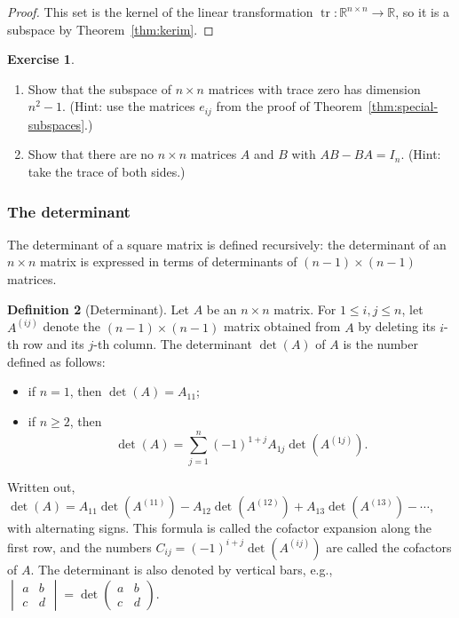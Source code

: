 \documentclass[11pt]{article}
\theoremstyle{definition}
\newtheorem{definition}{Definition}[section]
\newtheorem{exercise}[definition]{Exercise}
\theoremstyle{plain}
\theoremstyle{remark}
\DeclareMathOperator{\tr}{tr}
\begin{document}
\begin{proof}
    This set is the kernel of the linear transformation $\tr: \mathbb{R}^{n \times n} \to \mathbb{R}$, so it is a subspace by Theorem~\ref{thm:kerim}.
\end{proof}

\begin{exercise}
    \begin{enumerate}
        \item Show that the subspace of $n \times n$ matrices with trace zero has dimension $n^2 - 1$. (Hint: use the matrices $e_{ij}$ from the proof of Theorem~\ref{thm:special-subspaces}.)
        \item Show that there are no $n \times n$ matrices $A$ and $B$ with $AB - BA = I_n$. (Hint: take the trace of both sides.)
    \end{enumerate}
\end{exercise}

\subsubsection{The determinant}

The determinant of a square matrix is defined recursively: the determinant of an $n \times n$ matrix is expressed in terms of determinants of $(n-1) \times (n-1)$ matrices.

\begin{definition}[Determinant]
    Let $A$ be an $n \times n$ matrix. For $1 \leq i, j \leq n$, let $A^{(ij)}$ denote the $(n-1) \times (n-1)$ matrix obtained from $A$ by deleting its $i$-th row and its $j$-th column. The determinant $\det(A)$ of $A$ is the number defined as follows:
    \begin{itemize}
        \item if $n = 1$, then $\det(A) = A_{11}$;
        \item if $n \geq 2$, then
        \[\det(A) = \sum_{j=1}^n (-1)^{1+j} A_{1j} \det(A^{(1j)}).\]
    \end{itemize}
    Written out, $\det(A) = A_{11} \det(A^{(11)}) - A_{12} \det(A^{(12)}) + A_{13} \det(A^{(13)}) - \cdots$, with alternating signs. This formula is called the cofactor expansion along the first row, and the numbers $C_{ij} = (-1)^{i+j} \det(A^{(ij)})$ are called the cofactors of $A$. The determinant is also denoted by vertical bars, e.g., $\begin{vmatrix} a & b \\ c & d \end{vmatrix} = \det \begin{pmatrix} a & b \\ c & d \end{pmatrix}$.
\end{definition}
\end{document}
